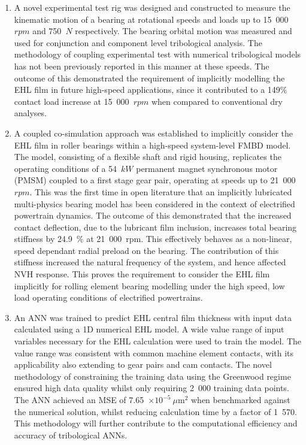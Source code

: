 \begin{enumerate}
	\item A novel experimental test rig was designed and constructed to measure the kinematic motion of a bearing at rotational speeds and loads up to 15~000~$rpm$ and 750~$N$ respectively. The bearing orbital motion was measured and used for conjunction and component level tribological analysis. The methodology of coupling experimental test with numerical tribological models has not been previously reported in this manner at these speeds. The outcome of this demonstrated the requirement of implicitly modelling the EHL film in future high-speed applications, since it contributed to a 149\% contact load increase at 15~000~$rpm$ when compared to conventional dry analyses.
	
	\item A coupled co-simulation approach was established to implicitly consider the EHL film in roller bearings within a high-speed system-level FMBD model. The model, consisting of a flexible shaft and rigid housing, replicates the operating conditions of a 54~$kW$ permanent magnet synchronous motor (PMSM) coupled to a first stage gear pair, operating at speeds up to 21~000~$rpm$. This was the first time in open literature that an implicitly lubricated multi-physics bearing model has been considered in the context of electrified powertrain dynamics. The outcome of this demonstrated that the increased contact deflection, due to the lubricant film inclusion, increases total bearing stiffness by 24.9~\% at 21~000~rpm. This effectively behaves as a non-linear, speed dependant radial preload on the bearing. The contribution of this stiffness increased the natural frequency of the system, and hence affected NVH response. This proves the requirement to consider the EHL film implicitly for rolling element bearing modelling under the high speed, low load operating conditions of electrified powertrains.
	
	\item An ANN was trained to predict EHL central film thickness with input data calculated using a 1D numerical EHL model. A wide value range of input variables necessary for the EHL calculation were used to train the model. The value range was consistent with common machine element contacts, with its applicability also extending to gear pairs and cam contacts. The novel methodology of constraining the training data using the Greenwood regime ensured high data quality whilst only requiring 2~000 training data points. The ANN achieved an MSE of 7.65~$\times 10^{-5}~\mu \mathrm{m}^2$ when benchmarked against the numerical solution, whilst reducing calculation time by a factor of 1~570. This methodology will further contribute to the computational efficiency and accuracy of tribological ANNs.
	

\end{enumerate}
